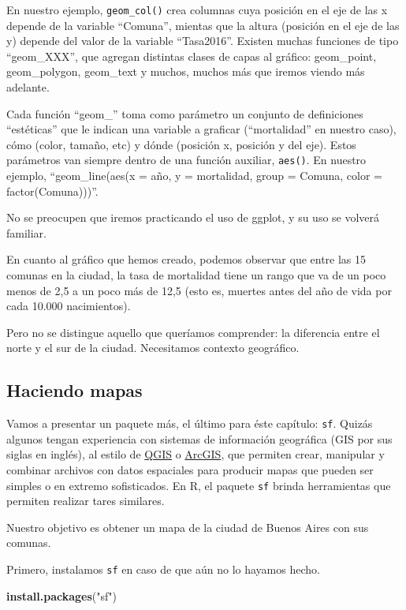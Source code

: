 \documentclass[spanish,]{book}
\newenvironment{Shaded}{\begin{snugshade}}{\end{snugshade}}
\newcommand{\KeywordTok}[1]{\textcolor[rgb]{0.13,0.29,0.53}{\textbf{#1}}}
\newcommand{\NormalTok}[1]{#1}
\newcommand{\StringTok}[1]{\textcolor[rgb]{0.31,0.60,0.02}{#1}}
\begin{document}
En nuestro ejemplo, \texttt{geom\_col()} crea columnas cuya posición en el eje de las x depende de la variable ``Comuna'', mientas que la altura (posición en el eje de las y) depende del valor de la variable ``Tasa2016''. Existen muchas funciones de tipo ``geom\_XXX'', que agregan distintas clases de capas al gráfico: geom\_point, geom\_polygon, geom\_text y muchos, muchos más que iremos viendo más adelante.

Cada función ``geom\_'' toma como parámetro un conjunto de definiciones ``estéticas'' que le indican una variable a graficar (``mortalidad'' en nuestro caso), cómo (color, tamaño, etc) y dónde (posición x, posición y del eje). Estos parámetros van siempre dentro de una función auxiliar, \texttt{aes()}. En nuestro ejemplo, ``geom\_line(aes(x = año, y = mortalidad, group = Comuna, color = factor(Comuna)))''.

No se preocupen que iremos practicando el uso de ggplot, y su uso se volverá familiar.

En cuanto al gráfico que hemos creado, podemos observar que entre las 15 comunas en la ciudad, la tasa de mortalidad tiene un rango que va de un poco menos de 2,5 a un poco más de 12,5 (esto es, muertes antes del año de vida por cada 10.000 nacimientos).

Pero no se distingue aquello que queríamos comprender: la diferencia entre el norte y el sur de la ciudad. Necesitamos contexto geográfico.

\hypertarget{haciendo-mapas}{%
\subsection{Haciendo mapas}\label{haciendo-mapas}}

Vamos a presentar un paquete más, el último para éste capítulo: \texttt{sf}. Quizás algunos tengan experiencia con sistemas de información geográfica (GIS por sus siglas en inglés), al estilo de \href{https://qgis.org/en/site/}{QGIS} o \href{https://www.arcgis.com/features/index.html}{ArcGIS}, que permiten crear, manipular y combinar archivos con datos espaciales para producir mapas que pueden ser simples o en extremo sofisticados. En R, el paquete \texttt{sf} brinda herramientas que permiten realizar tares similares.

Nuestro objetivo es obtener un mapa de la ciudad de Buenos Aires con sus comunas.

Primero, instalamos \texttt{sf} en caso de que aún no lo hayamos hecho.

\begin{Shaded}
\begin{Highlighting}[]
\KeywordTok{install.packages}\NormalTok{(}\StringTok{"sf"}\NormalTok{)}
\end{Highlighting}
\end{Shaded}
\end{document}
